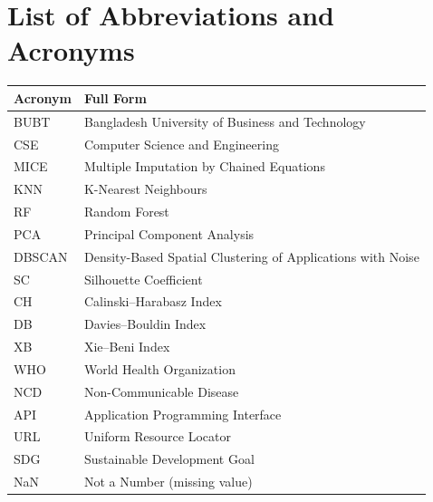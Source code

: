 \chapter*{List of Abbreviations and Acronyms}

\renewcommand{\arraystretch}{1.4}
\begin{tabularx}{\textwidth}{l X}
\toprule
\textbf{Acronym} & \textbf{Full Form} \\
\midrule
BUBT   & Bangladesh University of Business and Technology \\
CSE    & Computer Science and Engineering \\
MICE   & Multiple Imputation by Chained Equations \\
KNN    & K-Nearest Neighbours \\
RF     & Random Forest \\
PCA    & Principal Component Analysis \\
DBSCAN & Density-Based Spatial Clustering of Applications with Noise \\
SC     & Silhouette Coefficient \\
CH     & Calinski--Harabasz Index \\
DB     & Davies--Bouldin Index \\
XB     & Xie--Beni Index \\
WHO    & World Health Organization \\
NCD    & Non-Communicable Disease \\
API    & Application Programming Interface \\
URL    & Uniform Resource Locator \\
SDG    & Sustainable Development Goal \\
NaN    & Not a Number (missing value) \\
\bottomrule
\end{tabularx}

\clearpage
